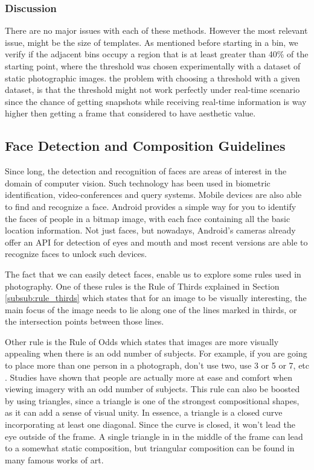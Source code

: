 \subsubsection{Discussion}

There are no major issues with each of these methods. However the most relevant issue, might be the size of templates. As mentioned before starting in a bin, we verify if the adjacent bins occupy a region that is at least greater than 40\% of the starting point, where the threshold was chosen experimentally with a dataset of static photographic images. the problem with choosing a threshold with a given dataset, is that the threshold might not work perfectly under real-time scenario since the chance of getting snapshots while receiving real-time information is way higher then getting a frame that considered to have aesthetic value.

\subsection{Face Detection and Composition Guidelines}
\label{sub:face_guidelines}

Since long, the detection and recognition of faces are areas of interest in the domain of computer vision. Such technology has been used in biometric identification, video-conferences and query systems.
Mobile devices are also able to find and recognize a face. Android provides a simple way for you to identify the faces of people in a bitmap image, with each face containing all the basic location information. Not just faces, but nowadays, Android's cameras already offer an API for detection of eyes and mouth and most recent versions are able to recognize faces to unlock such devices.

The fact that we can easily detect faces, enable us to explore some rules used in photography. One of these rules is the Rule of Thirds explained in Section \ref{subsub:rule_thirds} which states that for an image to be visually interesting, the main focus of the image needs to lie along one of the lines marked in thirds, or the intersection points between those lines\cite{kamps2012rules}.

Other rule is the Rule of Odds which states that images are more visually appealing when there is an odd number of subjects. For example, if you are going to place more than one person in a photograph, don’t use two, use 3 or 5 or 7, etc \cite{kamps2012rules}. Studies have shown that people are actually more at ease and comfort when viewing imagery with an odd number of subjects. This rule can also be boosted by using triangles, since a triangle is one of the strongest compositional shapes, as it can add a sense of visual unity. In essence, a triangle is a closed curve incorporating at least one diagonal. Since the curve is closed, it won't lead the eye outside of the frame. A single triangle in in the middle of the frame can lead to a somewhat static composition, but triangular composition can be found in many famous works of art.

